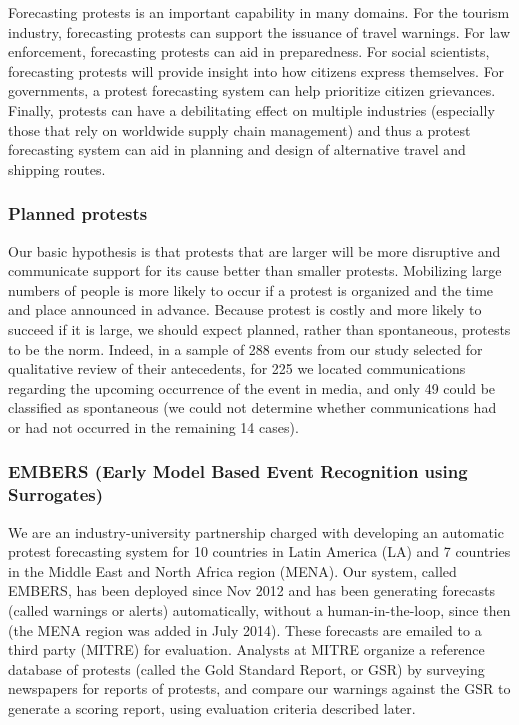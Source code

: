 \documentclass[letterpaper]{article}
\begin{document}
Forecasting protests is an important capability in many domains.  For
the tourism industry, forecasting protests can support the issuance of
travel warnings. For law enforcement, forecasting protests can aid in
preparedness. For social scientists, forecasting protests will provide
insight into how citizens express themselves.  For governments, a
protest forecasting system can help prioritize citizen grievances.
Finally, protests can have a debilitating effect on multiple industries
(especially those that rely on worldwide supply chain management) and
thus a protest forecasting system can aid in planning and design of
alternative travel and shipping routes.

\subsubsection{Planned protests}
Our basic hypothesis is that protests that are larger will be more
disruptive and communicate support for its cause better than smaller
protests.  Mobilizing large numbers of people is more likely to occur if
a protest is organized and the time and place announced in advance.
Because protest is costly and more likely to succeed if it is large, we
should expect planned, rather than spontaneous, protests to be the norm.
Indeed, in a sample of 288 events from our study selected for
qualitative review of their antecedents, for 225 we located
communications regarding the upcoming occurrence of the event in media,
and only 49 could be classified as spontaneous (we could not determine
whether communications had or had not occurred in the remaining 14
cases).

\subsubsection{EMBERS (Early Model Based Event Recognition using
Surrogates)}
We are an industry-university partnership charged with developing an
automatic protest forecasting system for 10 countries in Latin America
(LA) and 7 countries in the Middle East and North Africa region (MENA).
Our system, called EMBERS, has been deployed since Nov 2012 and has been
generating forecasts (called warnings or alerts) automatically, without
a human-in-the-loop, since then (the MENA region was added in July
2014). These forecasts are emailed to a third party (MITRE) for
evaluation. Analysts at MITRE organize a reference database of protests
(called the Gold Standard Report, or GSR) by surveying newspapers for
reports of protests, and compare our warnings against the GSR to
generate a scoring report, using evaluation criteria described later.
\end{document}
